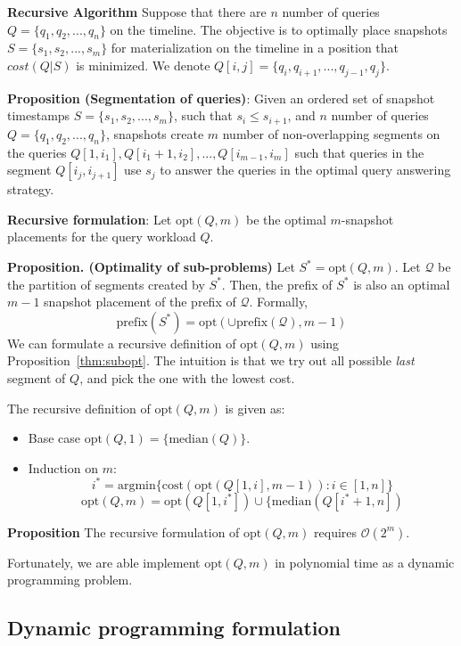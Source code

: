 \textbf{Recursive Algorithm} Suppose that there are $n$ number of queries $Q = \{q_1,q_2,...,q_n\}$ on the timeline. The objective is to optimally place snapshots $S=\{s_1,s_2,...,s_m\}$ for materialization on the timeline in a position that $cost(Q|S)$ is minimized. We denote $Q[i,j] = \{q_i,q_{i+1},...,q_{j-1},q_j\}$.

\textbf{Proposition (Segmentation of queries)}: Given an ordered set of snapshot timestamps $S=\{s_1,s_2,...,s_m\}$, such that $s_i \leq s_{i+1}$, and $n$ number of queries $Q = \{q_1,q_2,...,q_n\}$, snapshots create $m$ number of non-overlapping segments on the queries $Q[1,i_1],Q[i_1+1,i_2],...,Q[i_{m-1},i_m]$ such that queries in the segment $Q[i_j,i_{j+1}]$ use $s_j$ to answer the queries in the optimal query answering strategy.   

\textbf{Recursive formulation}: 
Let $\mathrm{opt}(Q, m)$ be the optimal $m$-snapshot placements for the query
workload $Q$.

\textbf{Proposition. (Optimality of sub-problems)}
Let $S^* = \mathrm{opt}(Q, m)$.  Let $\mathcal{Q}$ be the partition of segments created by $S^*$.  Then, the prefix of $S^*$ is also an optimal $m-1$ snapshot placement of the prefix of $\mathcal{Q}$. Formally, $$\mathrm{prefix}(S^*) = \mathrm{opt}(\cup\mathrm{prefix}(\mathcal{Q}), m-1)$$
We can formulate a recursive definition of $\mathrm{opt}(Q, m)$ using
Proposition~\ref{thm:subopt}.  The intuition is that we try out all possible
{\em last} segment of $Q$, and pick the one with the lowest cost.

The recursive definition of $\mathrm{opt}(Q, m)$ is given as:

\begin{itemize}
	\item Base case $ \mathrm{opt}(Q, 1) = \{\mathrm{median}(Q)\}$.
	\item Induction on $m$:
	$$i^* = \mathrm{argmin}\{\mathrm{cost}(\mathrm{opt}(Q[1,i], m-1)): i\in[1,
	n]\}$$
	$$
	\mathrm{opt}(Q, m) = \mathrm{opt}(Q[1, i^*]) \cup \{\mathrm{median}(Q[i^*+1, n])
	$$
\end{itemize}

\textbf{Proposition}
The recursive formulation of $\mathrm{opt}(Q, m)$ requires $\mathcal{O}(2^{m})$.

Fortunately, we are able implement $\mathrm{opt}(Q, m)$ in polynomial time as a
dynamic programming problem.

\subsection{Dynamic programming formulation}
\label{sec:dynamic}

